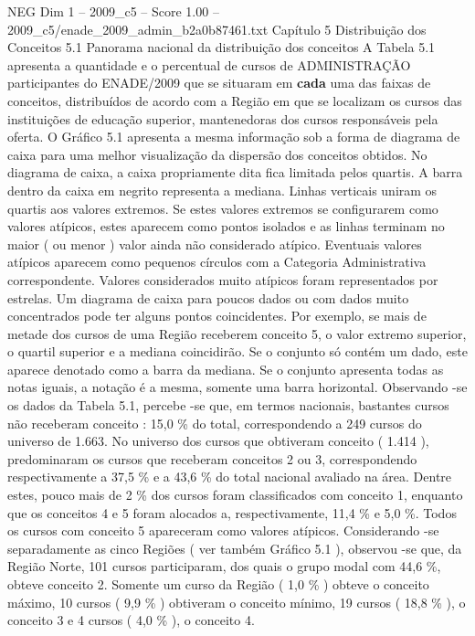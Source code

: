 \begin{textsample}{NEG Dim 1 – 2009\_c5 – Score 1.00 – 2009\_c5/enade\_2009\_admin\_b2a0b87461.txt}  \label{ex:f1_neg_299}
Capítulo 5 Distribuição dos Conceitos 5.1 Panorama nacional da distribuição dos conceitos A Tabela 5.1 apresenta a quantidade e o percentual de cursos de ADMINISTRAÇÃO participantes do ENADE/2009 que se situaram em \textbf{cada} uma das faixas de conceitos, distribuídos de acordo com a Região em que se localizam os cursos das instituições de educação superior, mantenedoras dos cursos responsáveis pela oferta.
O Gráfico 5.1 apresenta a mesma informação sob a forma de diagrama de caixa para uma melhor visualização da dispersão dos conceitos obtidos.
No diagrama de caixa, a caixa propriamente dita fica limitada pelos quartis.
A barra dentro da caixa em negrito representa a mediana.
Linhas verticais uniram os quartis aos valores extremos.
Se estes valores extremos se configurarem como valores atípicos, estes aparecem como pontos isolados e as linhas terminam no maior ( ou menor ) valor ainda não considerado atípico.
Eventuais valores atípicos aparecem como pequenos círculos com a Categoria Administrativa correspondente.
Valores considerados muito atípicos foram representados por estrelas.
Um diagrama de caixa para poucos dados ou com dados muito concentrados pode ter alguns pontos coincidentes.
Por exemplo, se mais de metade dos cursos de uma Região receberem conceito 5, o valor extremo superior, o quartil superior e a mediana coincidirão.
Se o conjunto só contém um dado, este aparece denotado como a barra da mediana.
Se o conjunto apresenta todas as notas iguais, a notação é a mesma, somente uma barra horizontal.
Observando -se os dados da Tabela 5.1, percebe -se que, em termos nacionais, bastantes cursos não receberam conceito : 15,0 \% do total, correspondendo a 249 cursos do universo de 1.663.
No universo dos cursos que obtiveram conceito ( 1.414 ), predominaram os cursos que receberam conceitos 2 ou 3, correspondendo respectivamente a 37,5 \% e a 43,6 \% do total nacional avaliado na área.
Dentre estes, pouco mais de 2 \% dos cursos foram classificados com conceito 1, enquanto que os conceitos 4 e 5 foram alocados a, respectivamente, 11,4 \% e 5,0 \%.
Todos os cursos com conceito 5 apareceram como valores atípicos.
Considerando -se separadamente as cinco Regiões ( ver também Gráfico 5.1 ), observou -se que, da Região Norte, 101 cursos participaram, dos quais o grupo modal com 44,6 \%, obteve conceito 2.
Somente um curso da Região ( 1,0 \% ) obteve o conceito máximo, 10 cursos ( 9,9 \% ) obtiveram o conceito mínimo, 19 cursos ( 18,8 \% ), o conceito 3 e 4 cursos ( 4,0 \% ), o conceito 4.

\end{textsample}
